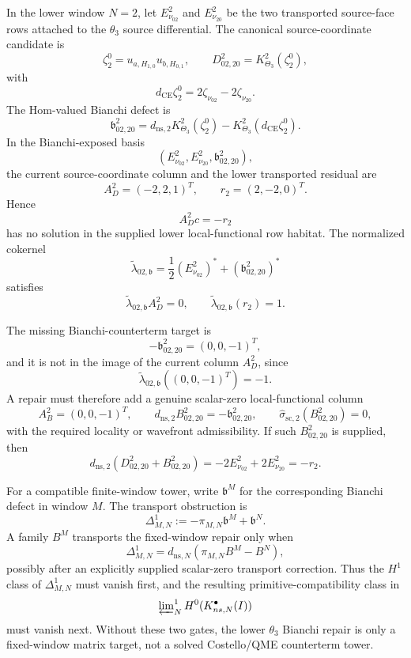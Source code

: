 \begin{prop}
\label{prop:app-theta-three-bianchi-exposed-lower-gate}
  In the lower window \(N=2\), let
  \(E^2_{\nu_{02}}\) and \(E^2_{\nu_{20}}\) be the two transported
  source-face rows attached to the \(\theta_3\) source differential.  The
  canonical source-coordinate candidate is
  \[
    \zeta^0_2=u_{a,H_{1,0}}u_{b,H_{0,1}},
    \qquad
    D^2_{02,20}=K^2_{\Theta_3}(\zeta^0_2),
  \]
  with
  \[
    d_{\mathrm{CE}}\zeta^0_2
      =
    2\zeta_{\nu_{02}}-2\zeta_{\nu_{20}} .
  \]
  The Hom-valued Bianchi defect is
  \[
    \mathfrak b^2_{02,20}
      =
    d_{\mathrm{ns},2}K^2_{\Theta_3}(\zeta^0_2)
      -
    K^2_{\Theta_3}(d_{\mathrm{CE}}\zeta^0_2).
  \]
  In the Bianchi-exposed basis
  \[
    (E^2_{\nu_{02}},E^2_{\nu_{20}},\mathfrak b^2_{02,20}),
  \]
  the current source-coordinate column and the lower transported residual
  are
  \[
    A_D^2=(-2,2,1)^T,\qquad r_2=(2,-2,0)^T .
  \]
  Hence
  \[
    A_D^2c=-r_2
  \]
  has no solution in the supplied lower local-functional row habitat.  The
  normalized cokernel
  \[
    \widetilde\lambda_{02,\mathfrak b}
      =
    \frac12(E^2_{\nu_{02}})^*
      +(\mathfrak b^2_{02,20})^*
  \]
  satisfies
  \[
    \widetilde\lambda_{02,\mathfrak b}A_D^2=0,\qquad
    \widetilde\lambda_{02,\mathfrak b}(r_2)=1 .
  \]

  The missing Bianchi-counterterm target is
  \[
    -\mathfrak b^2_{02,20}=(0,0,-1)^T,
  \]
  and it is not in the image of the current column \(A_D^2\), since
  \[
    \widetilde\lambda_{02,\mathfrak b}((0,0,-1)^T)=-1 .
  \]
  A repair must therefore add a genuine scalar-zero local-functional
  column
  \[
    A_B^2=(0,0,-1)^T,\qquad
    d_{\mathrm{ns},2}B^2_{02,20}
      =
    -\mathfrak b^2_{02,20},
    \qquad
    \widehat\sigma_{\mathrm{sc},2}(B^2_{02,20})=0,
  \]
  with the required locality or wavefront admissibility.  If such
  \(B^2_{02,20}\) is supplied, then
  \[
    d_{\mathrm{ns},2}(D^2_{02,20}+B^2_{02,20})
      =
    -2E^2_{\nu_{02}}+2E^2_{\nu_{20}}
      =
    -r_2 .
  \]

  For a compatible finite-window tower, write
  \(\mathfrak b^M\) for the corresponding Bianchi defect in window \(M\).
  The transport obstruction is
  \[
    \Delta^1_{M,N}
      :=
    -\pi_{M,N}\mathfrak b^M+\mathfrak b^N .
  \]
  A family \(B^M\) transports the fixed-window repair only when
  \[
    \Delta^1_{M,N}
      =
    d_{\mathrm{ns},N}(\pi_{M,N}B^M-B^N),
  \]
  possibly after an explicitly supplied scalar-zero transport correction.
  Thus the \(H^1\) class of \(\Delta^1_{M,N}\) must vanish first, and the
  resulting primitive-compatibility class in
  \[
    \varprojlim\nolimits^1_N
    H^0(\mathcal K^\bullet_{\mathrm{ns},N}(I))
  \]
  must vanish next.  Without these two gates, the lower \(\theta_3\)
  Bianchi repair is only a fixed-window matrix target, not a solved
  Costello/QME counterterm tower.
\end{prop}

